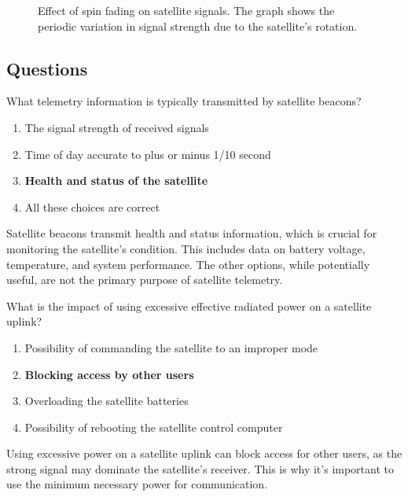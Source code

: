 \begin{figure}[h!]
    \centering
    \caption{Effect of spin fading on satellite signals. The graph shows the periodic variation in signal strength due to the satellite's rotation.}
    \label{fig:spin_fading}
\end{figure}

\subsection*{Questions}
\begin{tcolorbox}[colback=gray!10!white,colframe=black!75!black,title={T8B01}]
    What telemetry information is typically transmitted by satellite beacons?
    \begin{enumerate}[label=\Alph*,noitemsep]
        \item The signal strength of received signals
        \item Time of day accurate to plus or minus 1/10 second
        \item \textbf{Health and status of the satellite}
        \item All these choices are correct
    \end{enumerate}
\end{tcolorbox}
Satellite beacons transmit health and status information, which is crucial for monitoring the satellite's condition. This includes data on battery voltage, temperature, and system performance. The other options, while potentially useful, are not the primary purpose of satellite telemetry.


\begin{tcolorbox}[colback=gray!10!white,colframe=black!75!black,title={T8B02}]
    What is the impact of using excessive effective radiated power on a satellite uplink?
    \begin{enumerate}[label=\Alph*,noitemsep]
        \item Possibility of commanding the satellite to an improper mode
        \item \textbf{Blocking access by other users}
        \item Overloading the satellite batteries
        \item Possibility of rebooting the satellite control computer
    \end{enumerate}
\end{tcolorbox}
Using excessive power on a satellite uplink can block access for other users, as the strong signal may dominate the satellite's receiver. This is why it's important to use the minimum necessary power for communication.

